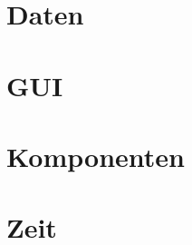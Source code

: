\documentclass[a4paper,11pt,listof=numbered,glossary=totoc,parskip=half,toc=bib]{scrreprt}
\begin{document}
	\section{Daten}
	\section{GUI}
	\section{Komponenten}
	\section{Zeit}
	
	

	\setcounter{chapter}{0}
	
	
	
\end{document}
